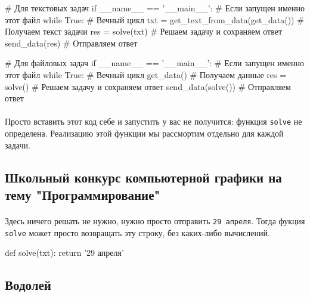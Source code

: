\documentclass[12pt]{article}
\begin{document}
    \begin{pythoncode}
# Для текстовых задач
if __name__ == '__main__':                        # Если запущен именно этот файл
    while True:                                   # Вечный цикл
        txt = get_text_from_data(get_data())      # Получаем текст задачи
        res = solve(txt)                          # Решаем задачу и сохраняем ответ
        send_data(res)                            # Отправляем ответ
    \end{pythoncode}

    \begin{pythoncode}
# Для файловых задач
if __name__ == '__main__':                        # Если запущен именно этот файл
    while True:                                   # Вечный цикл
        get_data()                                # Получаем данные
        res = solve()                             # Решаем задачу и сохраняем ответ
        send_data(solve())                        # Отправляем ответ
    \end{pythoncode}

    \paragraph{}
    Просто вставить этот код себе и запустить у вас не получится: функция \verb|solve| не определена.
    Реализацию этой функции мы рассмортим отдельно для каждой задачи.

    \newpage


    \subsection{Школьный конкурс компьютерной графики на тему "Программирование"}
    \paragraph{}
    Здесь ничего решать не нужно, нужно просто отправить \verb|29 апреля|.
    Тогда фукция \verb|solve| может просто возвращать эту строку, без каких-либо вычислений.
    \begin{pythoncode}
def solve(txt):
    return '29 апреля'
    \end{pythoncode}


    \subsection{Водолей}
\end{document}
